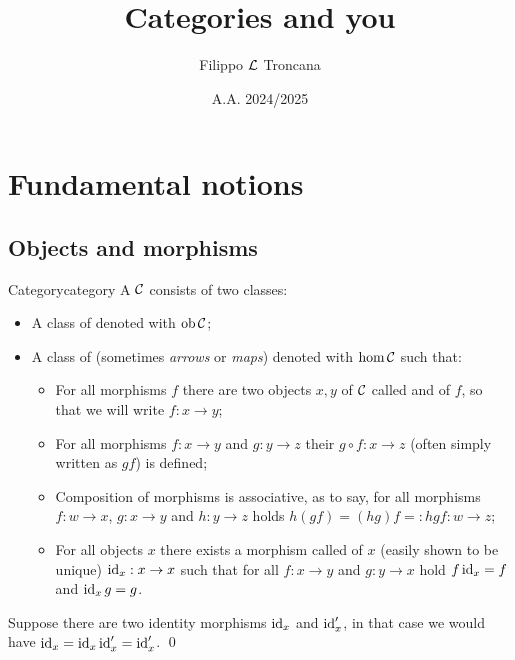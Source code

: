 \documentclass{article}
\title{Categories and you}
\author{Filippo $\mathcal{L}$ Troncana}
\date{A.A. 2024/2025}
\begin{document}
\maketitle



\section{Fundamental notions}

\subsection{Objects and morphisms}

\begin{definition}{Category}{category}
    A  $\mathcal{C}$ consists of two classes:\begin{itemize}
        \item A class of  denoted with $\operatorname{ob}\mathcal{C}$;
        \item A class of  (sometimes \emph{arrows} or \emph{maps}) denoted with $\hom\mathcal{C}$ such that:\begin{itemize}
            \item For all morphisms $f$ there are two objects $x,y$ of $\mathcal{C}$ called  and  of $f$, so that we will write $f: x\to y$;
            \item For all morphisms $f : x\to y$ and $g: y \to z$ their  $g\circ f: x\to z$ (often simply written as $gf$) is defined;
            \item Composition of morphisms is associative, as to say, for all morphisms $f:w\to x$, $g: x\to y$ and $h: y\to z$ holds $h(gf) = (hg)f =: hgf: w\to z$;
            \item For all objects $x$ there exists a morphism called  of $x$ (easily shown to be unique) $\operatorname{id}_x : x\to x$ such that for all $f: x\to y$ and $g : y\to x$ hold $f\operatorname{id}_x = f$ and $\operatorname{id}_x g = g$.
        \end{itemize}
    \end{itemize}
    \proof 
    Suppose there are two identity morphisms $\operatorname{id}_x$ and $\operatorname{id}_x'$, in that case we would have $\operatorname{id}_x = \operatorname{id}_x\operatorname{id}_x' = \operatorname{id}_x'$.
    \qed
\end{definition}
\end{document}

